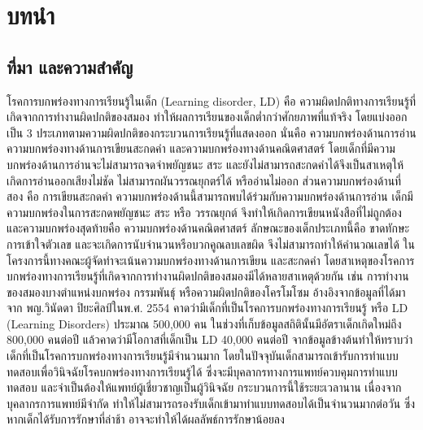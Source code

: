 \documentclass[12pt,oneside,openright,a4paper]{cpe-thai-project}
\begin{document}



\chapter{บทนำ}






\section{ที่มา และความสำคัญ}

\par โรคการบกพร่องทางการเรียนรู้ในเด็ก (Learning disorder, LD) คือ ความผิดปกติทางการเรียนรู้ที่เกิดจากการทำงานผิดปกติของสมอง ทำให้ผลการเรียนของเด็กต่ำกว่าศักยภาพที่แท้จริง โดยแบ่งออกเป็น 3 ประเภทตามความผิดปกติของกระบวนการเรียนรู้ที่แสดงออก นั่นคือ ความบกพร่องด้านการอ่าน ความบกพร่องทางด้านการเขียนสะกดคำ และความบกพร่องทางด้านคณิตศาสตร์ โดยเด็กที่มีความบกพร่องด้านการอ่านจะไม่สามารถจดจำพยัญชนะ สระ และยังไม่สามารถสะกดคำได้จึงเป็นสาเหตุให้  เกิดการอ่านออกเสียงไม่ชัด ไม่สามารถผันวรรณยุกตร์ได้ หรืออ่านไม่ออก ส่วนความบกพร่องด้านที่สอง คือ   การเขียนสะกดคำ ความบกพร่องด้านนี้สามารถพบได้ร่วมกับความบกพร่องด้านการอ่าน เด็กมีความบกพร่องในการสะกดพยัญชนะ สระ หรือ วรรณยุกต์ จึงทำให้เกิดการเขียนหนังสือที่ไม่ถูกต้อง และความบกพร่องสุดท้ายคือ ความบกพร่องด้านคณิตศาสตร์ ลักษณะของเด็กประเภทนี้คือ ขาดทักษะการเข้าใจตัวเลข และจะเกิดการนับจำนวนหรือบวกคูณลบเลขผิด จึงไม่สามารถทำให้คำนวณเลขได้ ในโครงการนี้ทางคณะผู้จัดทำจะเน้นความบกพร่องทางด้านการเขียน และสะกดคำ โดยสาเหตุของโรคการบกพร่องทางการเรียนรู้ที่เกิดจากการทำงานผิดปกติของสมองมีได้หลายสาเหตุด้วยกัน เช่น การทำงานของสมองบางตำแหน่งบกพร่อง กรรมพันธุ์ หรือความผิดปกติของโครโมโซม อ้างอิงจากข้อมูลที่ได้มาจาก พญ.วินัดดา ปิยะศิลป์ในพ.ศ. 2554 คาดว่ามีเด็กที่เป็นโรคการบกพร่องทางการเรียนรู้ หรือ LD (Learning  Disorders)  ประมาณ 500,000 คน ในช่วงที่เก็บข้อมูลสถิตินั้นมีอัตราเด็กเกิดใหม่ถึง 800,000 คนต่อปี แล้วคาดว่ามีโอกาสที่เด็กเป็น LD 40,000 คนต่อปี จากข้อมูลข้างต้นทำให้ทราบว่าเด็กที่เป็นโรคการบกพร่องทางการเรียนรู้มีจำนวนมาก  โดยในปัจจุบันเด็กสามารถเข้ารับการทำแบบทดสอบเพื่อวินิจฉัยโรคบกพร่องทางการเรียนรู้ได้ ซึ่งจะมีบุคลากรทางการแพทย์ควบคุมการทำแบบทดสอบ และจำเป็นต้องให้แพทย์ผู้เชี่ยวชาญเป็นผู้วินิจฉัย กระบวนการนี้ใช้ระยะเวลานาน เนื่องจากบุคลากรการแพทย์มีจำกัด ทำให้ไม่สามารถรองรับเด็กเข้ามาทำแบบทดสอบได้เป็นจำนวนมากต่อวัน ซึ่งหากเด็กได้รับการรักษาที่ล่าช้า อาจจะทำให้ได้ผลลัพธ์การรักษาน้อยลง
\end{document}
